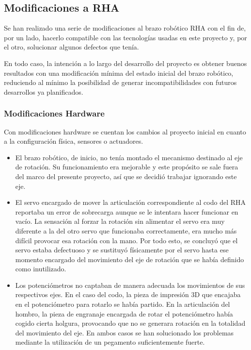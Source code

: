 \subsection{Modificaciones a RHA}

Se han realizado una serie de modificaciones al brazo robótico RHA con el fin de, por un lado, hacerlo compatible con las tecnologías usadas en este proyecto y, por el otro, solucionar algunos defectos que tenía.

En todo caso, la intención a lo largo del desarrollo del proyecto es obtener buenos resultados con una modificación mínima del estado inicial del brazo robótico, reduciendo al mínimo la posibilidad de generar incompatibilidades con futuros desarrollos ya planificados.

\subsubsection{Modificaciones Hardware}

Con modificaciones hardware se cuentan los cambios al proyecto inicial en cuanto a la configuración física, sensores o actuadores.

\begin{itemize}
\item El brazo robótico, de inicio, no tenía montado el mecanismo destinado al eje de rotación. Su funcionamiento era mejorable y este propósito se sale fuera del marco del presente proyecto, así que se decidió trabajar ignorando este eje.

\item El servo encargado de mover la articulación correspondiente al codo del RHA reportaba un error de sobrecarga aunque se le intentara hacer funcionar en vacío. La sensación al forzar la rotación sin alimentar el servo era muy diferente a la del otro servo que funcionaba correctamente, era mucho más difícil provocar esa rotación con la mano. Por todo esto, se concluyó que el servo estaba defectuoso y se sustituyó físicamente por el servo hasta ese momento encargado del movimiento del eje de rotación que se había definido como inutilizado.

\item Los potenciómetros no captaban de manera adecuada los movimientos de sus respectivos ejes. En el caso del codo, la pieza de impresión 3D que encajaba en el potenciómetro para rotarlo se había partido. En la articulación del hombro, la pieza de engranaje encargada de rotar el potenciómetro había cogido cierta holgura, provocando que no se generara rotación en la totalidad del movimiento del eje. En ambos casos se han solucionado los problemas mediante la utilización de un pegamento suficientemente fuerte.
\end{itemize}


